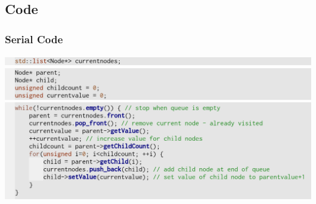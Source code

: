 \subsection{Code}
\begin{frame}
	\frametitle{Serial Code}
	\begin{center}
		\includegraphics[width=\textwidth]{img/code1} \\
		\includegraphics[width=\textwidth]{img/code2} \\
		\includegraphics[width=\textwidth]{img/code3}
	\end{center}
\end{frame}


